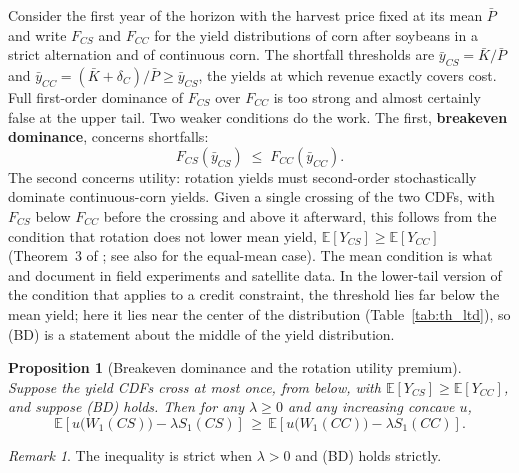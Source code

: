 \documentclass[11pt,letterpaper]{article}
\newtheorem{theorem}{Proposition}
\theoremstyle{remark}
\newtheorem*{remark}{Remark}
\begin{document}
Consider the first year of the horizon with the harvest price fixed at its mean $\bar P$ and write $F_{CS}$ and $F_{CC}$ for the yield distributions of corn after soybeans in a strict alternation and of continuous corn. The shortfall thresholds are $\bar y_{CS} = \bar K/\bar P$ and $\bar y_{CC} = (\bar K+\delta_C)/\bar P\ge\bar y_{CS}$, the yields at which revenue exactly covers cost. Full first-order dominance of $F_{CS}$ over $F_{CC}$ is too strong and almost certainly false at the upper tail. Two weaker conditions do the work. The first, \textbf{breakeven dominance}, concerns shortfalls:
\begin{equation}
F_{CS}(\bar y_{CS})\;\le\;F_{CC}(\bar y_{CC}). \tag{BD}
\end{equation}
The second concerns utility: rotation yields must second-order stochastically dominate continuous-corn yields. Given a single crossing of the two CDFs, with $F_{CS}$ below $F_{CC}$ before the crossing and above it afterward, this follows from the condition that rotation does not lower mean yield, $\mathbb{E}[Y_{CS}] \ge \mathbb{E}[Y_{CC}]$ (Theorem~3 of \citealt{Hanoch1969}; see also \citealt{Rothschild1970} for the equal-mean case). The mean condition is what \citet{Bullock1992} and \citet{Seifert2017} document in field experiments and satellite data. In the lower-tail version of the condition that applies to a credit constraint, the threshold lies far below the mean yield; here it lies near the center of the distribution (Table~\ref{tab:th_ltd}), so (BD) is a statement about the middle of the yield distribution.

\begin{theorem}[Breakeven dominance and the rotation utility premium]
\label{prop:ltd}
Suppose the yield CDFs cross at most once, from below, with $\mathbb{E}[Y_{CS}] \ge \mathbb{E}[Y_{CC}]$, and suppose (BD) holds. Then for any $\lambda \ge 0$ and any increasing concave $u$,
\begin{equation}
\mathbb{E}\left[u\bigl(W_1(CS)\bigr) - \lambda S_1(CS)\right]\,\ge\,\mathbb{E}\left[u\bigl(W_1(CC)\bigr) - \lambda S_1(CC)\right].
\end{equation}
\end{theorem}

\begin{remark}
The inequality is strict when $\lambda > 0$ and (BD) holds strictly.
\end{remark}
\end{document}
